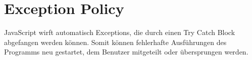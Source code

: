 
\chapter{Exception Policy}
JavaScript wirft automatisch Exceptions, die durch einen Try Catch Block abgefangen werden können. Somit können fehlerhafte Ausführungen des Programms neu gestartet, dem Benutzer mitgeteilt oder übersprungen werden.

